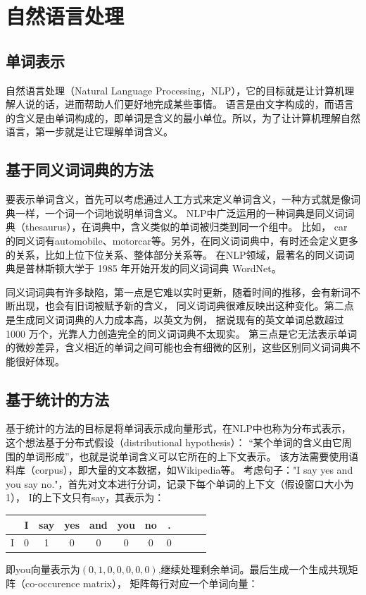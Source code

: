 \section{自然语言处理}
\subsection{单词表示}
自然语言处理（Natural Language Processing，NLP），它的目标就是让计算机理解人说的话，进而帮助人们更好地完成某些事情。
语言是由文字构成的，而语言的含义是由单词构成的，即单词是含义的最小单位。所以，为了让计算机理解自然语言，第一步就是让它理解单词含义。

\subsection{基于同义词词典的方法}
要表示单词含义，首先可以考虑通过人工方式来定义单词含义，一种方式就是像词典一样，一个词一个词地说明单词含义。
NLP中广泛运用的一种词典是同义词词典（thesaurus），在词典中，含义类似的单词被归类到同一个组中。
比如， car 的同义词有automobile、motorcar等。另外，在同义词词典中，有时还会定义更多的关系，比如上位下位关系、整体部分关系等。
在NLP领域，最著名的同义词词典是普林斯顿大学于 1985 年开始开发的同义词词典 WordNet。

同义词词典有许多缺陷，第一点是它难以实时更新，随着时间的推移，会有新词不断出现，也会有旧词被赋予新的含义，
同义词词典很难反映出这种变化。第二点是生成同义词词典的人力成本高，以英文为例，
据说现有的英文单词总数超过 1000 万个，光靠人力创造完全的同义词词典不太现实。
第三点是它无法表示单词的微妙差异，含义相近的单词之间可能也会有细微的区别，这些区别同义词词典不能很好体现。

\subsection{基于统计的方法}
基于统计的方法的目标是将单词表示成向量形式，在NLP中也称为分布式表示，这个想法基于分布式假设（distributional hypothesis）：
“某个单词的含义由它周围的单词形成”，也就是说单词含义可以它所在的上下文表示。
该方法需要使用语料库（corpus），即大量的文本数据，如Wikipedia等。
考虑句子："I say yes and you say no."，首先对文本进行分词，记录下每个单词的上下文（假设窗口大小为1），
I的上下文只有say，其表示为：
\begin{table}[H]
	\centering
	\begin{tabular}{c|cccccccccc}
		  & I & say & yes & and & you & no & . \\
		\hline
		I & 0 & 1   & 0   & 0   & 0   & 0  & 0 \\
	\end{tabular}
\end{table}
即you向量表示为$(0, 1, 0, 0, 0, 0, 0)$,继续处理剩余单词。最后生成一个生成共现矩阵（co-occurence matrix），
矩阵每行对应一个单词向量：

